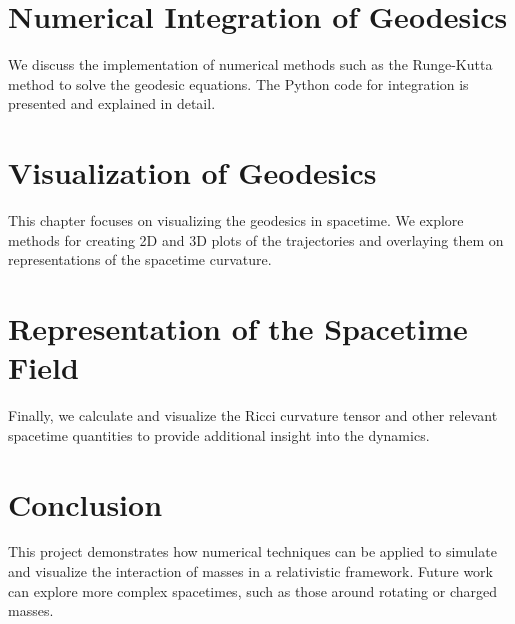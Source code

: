 \documentclass[12pt]{article}
\begin{document}
\newpage

\section{Numerical Integration of Geodesics}
We discuss the implementation of numerical methods such as the Runge-Kutta method to solve the geodesic equations. The Python code for integration is presented and explained in detail.

\newpage

\section{Visualization of Geodesics}
This chapter focuses on visualizing the geodesics in spacetime. We explore methods for creating 2D and 3D plots of the trajectories and overlaying them on representations of the spacetime curvature.

\newpage

\section{Representation of the Spacetime Field}
Finally, we calculate and visualize the Ricci curvature tensor and other relevant spacetime quantities to provide additional insight into the dynamics.

\newpage

\section*{Conclusion}
This project demonstrates how numerical techniques can be applied to simulate and visualize the interaction of masses in a relativistic framework. Future work can explore more complex spacetimes, such as those around rotating or charged masses.
\end{document}
